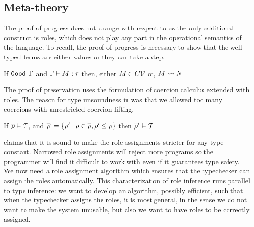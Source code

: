 \documentclass[screen,nonacm,manuscript,review]{acmart} %
\begin{document}
\subsection{Meta-theory}\label{sec:sfr-metatheory}
The proof of progress does not change with respect to \SFC as the only
additional construct is roles, which does not play any part in the
operational semantics of the language. To recall, the proof of
progress is necessary to show that the well typed terms are either
values or they can take a step.
\begin{theorem}\label{lem:sfr-progress}
 If $\texttt{Good~}\Gamma$ and $\Gamma \vdash M : \tau$ then, either $M \in C\mathcal{V}$ or, $M \rightsquigarrow N$
\end{theorem}
The proof of preservation uses the formulation of coercion calculus
extended with roles. The reason for
type unsoundness in \SFC was that we allowed too many coercions with
unrestricted coercion lifting.
\begin{lemma}\label{lem:role-narrowing}
If $\overline{\rho} \mathrel{\vDash} \mathcal{T}$, and $\overline{\rho}' = \{\rho'
  \mid \rho \in \overline{\rho}, \rho' \leq \rho\}$ then $\overline{\rho}' \mathrel{\vDash} \mathcal{T}$
\end{lemma}
 claims that it is sound to make the role
assignments stricter for any type constant. Narrowed role assignments
will reject more programs so the programmer will find it difficult to
work with even if it guarantees type safety. We now need a role
assignment algorithm which ensures that the typechecker can assign the
roles automatically. This characterization of role inference runs
parallel to type inference: we want to develop an algorithm, possibly
efficient, such that when the typechecker assigns the roles, it is
most general, in the sense we do not want to make the system unusable,
but also we want to have roles to be correctly assigned.
\end{document}
